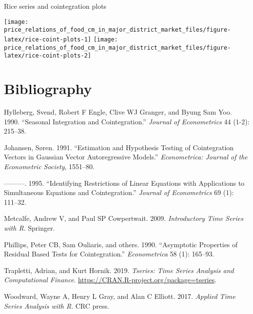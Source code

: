 \documentclass[
  12pt,
]{article}
\begin{document}
Rice series and cointegration plots

\begin{center}\texttt{[image: price\_relations\_of\_food\_cm\_in\_major\_district\_market\_files/figure-latex/rice-coint-plots-1]} \texttt{[image: price\_relations\_of\_food\_cm\_in\_major\_district\_market\_files/figure-latex/rice-coint-plots-2]} \end{center}

\hypertarget{bibliography}{%
\section*{Bibliography}\label{bibliography}}

\hypertarget{refs}{}
\leavevmode\hypertarget{ref-hylleberg1990seasonal}{}%
Hylleberg, Svend, Robert F Engle, Clive WJ Granger, and Byung Sam Yoo. 1990. ``Seasonal Integration and Cointegration.'' \emph{Journal of Econometrics} 44 (1-2): 215--38.

\leavevmode\hypertarget{ref-johansen1991estimation}{}%
Johansen, Søren. 1991. ``Estimation and Hypothesis Testing of Cointegration Vectors in Gaussian Vector Autoregressive Models.'' \emph{Econometrica: Journal of the Econometric Society}, 1551--80.

\leavevmode\hypertarget{ref-johansen1995identifying}{}%
---------. 1995. ``Identifying Restrictions of Linear Equations with Applications to Simultaneous Equations and Cointegration.'' \emph{Journal of Econometrics} 69 (1): 111--32.

\leavevmode\hypertarget{ref-metcalfe2009introductory}{}%
Metcalfe, Andrew V, and Paul SP Cowpertwait. 2009. \emph{Introductory Time Series with R}. Springer.

\leavevmode\hypertarget{ref-phillips1990asymptotic}{}%
Phillips, Peter CB, Sam Ouliaris, and others. 1990. ``Asymptotic Properties of Residual Based Tests for Cointegration.'' \emph{Econometrica} 58 (1): 165--93.

\leavevmode\hypertarget{ref-R-tseries}{}%
Trapletti, Adrian, and Kurt Hornik. 2019. \emph{Tseries: Time Series Analysis and Computational Finance}. \url{https://CRAN.R-project.org/package=tseries}.

\leavevmode\hypertarget{ref-woodward2017applied}{}%
Woodward, Wayne A, Henry L Gray, and Alan C Elliott. 2017. \emph{Applied Time Series Analysis with R}. CRC press.
\end{document}
